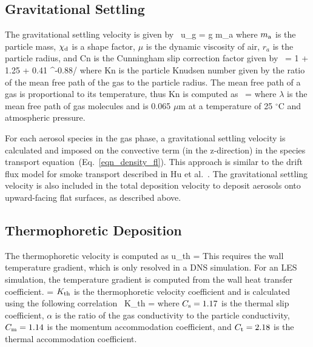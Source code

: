 \subsection{Gravitational Settling}

The gravitational settling velocity is given by~\cite{Davies_Charles}
\be
u_{\rm g} = g m_{\rm a} 
\ee
where $m_{\rm a}$ is the particle mass, $\chi_{\rm d}$ is a shape factor, $\mu$ is the dynamic viscosity of air,
$r_a$ is the particle radius, and Cn is the Cunningham slip correction factor given by~\cite{Cunningham:1}
\be
{} = 1 + 1.25 \;  + 0.41 \;  \; ^{-0.88/}
\ee
where Kn is the particle Knudsen number given by the ratio of the mean free path of the gas
to the particle radius. The mean free path of a gas is proportional to its temperature,
thus Kn is computed as~\cite{Sippola:1}
\be
{} =  
\ee
where $\lambda$ is the mean free path of gas molecules and is 0.065 $\mu$m at a temperature of 25 $^\circ$C and atmospheric pressure.

For each aerosol species in the gas phase, a gravitational settling velocity is calculated
and imposed on the convective term (in the z-direction) in the species transport
equation~(Eq.~\ref{eqn_density_fl}). This approach is similar to the drift flux model
for smoke transport described in Hu et al.~\cite{Hu:1}. The gravitational settling velocity
is also included in the total deposition velocity to deposit aerosols onto upward-facing flat surfaces,
as described above.


\subsection{Thermophoretic Deposition}

The thermophoretic velocity is computed as
\be
u_{\rm th} =  \; 
\ee
This requires the wall temperature gradient, which is only resolved in a DNS simulation.
For an LES simulation, the temperature gradient is computed from the wall heat transfer coefficient.
\be
  = 
\ee
$K_{\rm th}$ is the thermophoretic velocity coefficient and is calculated using the following correlation~\cite{Brock:1}
\be
 K_{\rm th} = 
\ee
where $C_{\rm s}=1.17$ is the thermal slip coefficient, $\alpha$ is the ratio of the gas
conductivity to the particle conductivity, $C_{\rm m}=1.14$ is the momentum accommodation
coefficient, and $C_{\rm t}=2.18$ is the thermal accommodation coefficient.

